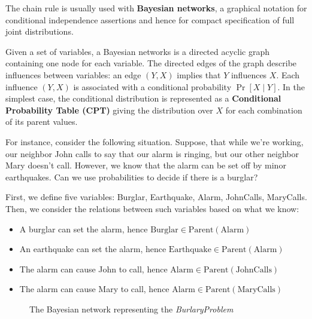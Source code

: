 \documentclass[a4paper, 12pt]{report}
\begin{document}
    The chain rule is usually used with \textbf{Bayesian networks}, a graphical notation for conditional independence assertions and hence for compact specification of full joint distributions.

    Given a set of variables, a Bayesian networks is a directed acyclic graph containing one node for each variable. The directed edges of the graph describe influences between variables: an edge $(Y,X)$ implies that $Y$ influences $X$. Each influence $(Y,X)$ is associated with a conditional probability $\Pr[X \mid Y]$. In the simplest case, the conditional distribution is represented as a \textbf{Conditional Probability Table (CPT)} giving the distribution over $X$ for each combination of its parent values.

    For instance, consider the following situation. Suppose, that while we're working, our neighbor John calls to say that our alarm is ringing, but our other neighbor Mary doesn't call. However, we know that the alarm can be set off by minor earthquakes. Can we use probabilities to decide if there is a burglar?

    First, we define five variables: Burglar, Earthquake, Alarm, JohnCalls, MaryCalls. Then, we consider the relations between such variables based on what we know:
    \begin{itemize}
        \item A burglar can set the alarm, hence $\mathrm{Burglar} \in \mathrm{Parent(Alarm)}$
        \item An earthquake can set the alarm, hence $\mathrm{Earthquake} \in \mathrm{Parent(Alarm)}$
        \item The alarm can cause John to call, hence $\mathrm{Alarm} \in \mathrm{Parent(JohnCalls)}$
        \item The alarm can cause Mary to call, hence $\mathrm{Alarm} \in \mathrm{Parent(MaryCalls)}$
    \end{itemize}

    \begin{figure}[H]
        \centering

        \caption{The Bayesian network representing the \textit{BurlaryProblem}}
    \end{figure}
\end{document}
